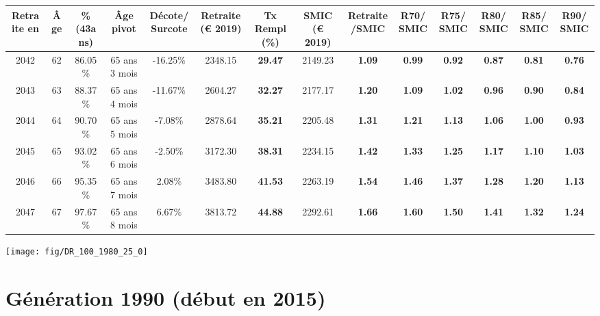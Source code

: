 \begin{adjustbox}{max width=\textwidth} 
\begin{tabular}[htb]{|c|c||c|c|c||c|c||c|c||c|c|c|c|c|} 
\hline 
 Retraite en &  Âge &  \%(43ans) &  Âge pivot &  Décote/Surcote &  Retraite (\euro{} 2019) &  Tx Rempl(\%) &  SMIC (\euro{} 2019) &  Retraite/SMIC &  R70/SMIC &  R75/SMIC &  R80/SMIC &  R85/SMIC &  R90/SMIC \\ 
\hline \hline 
 2042 &  62 &  86.05\% &  65 ans 3 mois &  -16.25\% &  2348.15 &  {\bf 29.47} &  2149.23 &  {\bf 1.09} &  {\bf {\color{red} 0.99}} &  {\bf {\color{red} 0.92}} &  {\bf {\color{red} 0.87}} &  {\bf {\color{red} 0.81}} &  {\bf {\color{red} 0.76}} \\ 
\hline 
 2043 &  63 &  88.37\% &  65 ans 4 mois &  -11.67\% &  2604.27 &  {\bf 32.27} &  2177.17 &  {\bf 1.20} &  {\bf 1.09} &  {\bf 1.02} &  {\bf {\color{red} 0.96}} &  {\bf {\color{red} 0.90}} &  {\bf {\color{red} 0.84}} \\ 
\hline 
 2044 &  64 &  90.70\% &  65 ans 5 mois &  -7.08\% &  2878.64 &  {\bf 35.21} &  2205.48 &  {\bf 1.31} &  {\bf 1.21} &  {\bf 1.13} &  {\bf 1.06} &  {\bf {\color{red} 1.00}} &  {\bf {\color{red} 0.93}} \\ 
\hline 
 2045 &  65 &  93.02\% &  65 ans 6 mois &  -2.50\% &  3172.30 &  {\bf 38.31} &  2234.15 &  {\bf 1.42} &  {\bf 1.33} &  {\bf 1.25} &  {\bf 1.17} &  {\bf 1.10} &  {\bf 1.03} \\ 
\hline 
 2046 &  66 &  95.35\% &  65 ans 7 mois &  2.08\% &  3483.80 &  {\bf 41.53} &  2263.19 &  {\bf 1.54} &  {\bf 1.46} &  {\bf 1.37} &  {\bf 1.28} &  {\bf 1.20} &  {\bf 1.13} \\ 
\hline 
 2047 &  67 &  97.67\% &  65 ans 8 mois &  6.67\% &  3813.72 &  {\bf 44.88} &  2292.61 &  {\bf 1.66} &  {\bf 1.60} &  {\bf 1.50} &  {\bf 1.41} &  {\bf 1.32} &  {\bf 1.24} \\ 
\hline 
\hline 
\end{tabular} 
\end{adjustbox} 
 
 \vspace{0.1cm} 

 {\hspace{-2.2cm}\texttt{[image: fig/DR\_100\_1980\_25\_0]}} 

\newpage 
 
\section{Génération 1990 (début en 2015)\label{DR_100_1990_25_0}} 
 
